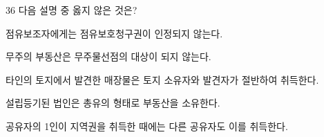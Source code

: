 \begin{question}{36}
다음 설명 중 옳지 않은 것은?
\begin{choices}
  \item 점유보조자에게는 점유보호청구권이 인정되지 않는다.
  \item 무주의 부동산은 무주물선점의 대상이 되지 않는다.
  \item 타인의 토지에서 발견한 매장물은 토지 소유자와 발견자가 절반하여 취득한다.
  \item 설립등기된 법인은 총유의 형태로 부동산을 소유한다.
  \item 공유자의 1인이 지역권을 취득한 때에는 다른 공유자도 이를 취득한다.
\end{choices}
\end{question}
